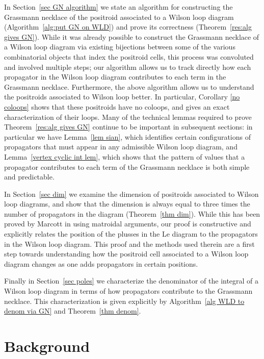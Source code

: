 \documentclass[11pt]{article}
\theoremstyle{remark}
\theoremstyle{definition}
\begin{document}
In Section~\ref{sec GN algorithm} we state an algorithm for constructing the Grassmann necklace of the positroid associated to a Wilson loop diagram (Algorithm~\ref{alg:put GN on WLD}) and prove its correctness (Theorem~\ref{res:alg gives GN}). While it was already possible to construct the Grassmann necklace of a Wilson loop diagram via existing bijections between some of the various combinatorial objects that index the positroid cells, this process was convoluted and involved multiple steps; our algorithm allows us to track directly how each propagator in the Wilson loop diagram contributes to each term in the Grassmann necklace. Furthermore, the above algorithm allows us to understand the positroids associated to Wilson loop better. In particular, Corollary \ref{no coloops} shows that these positroids have no coloops, and gives an exact characterization of their loops. Many of the technical lemmas required to prove Theorem~\ref{res:alg gives GN} continue to be important in subsequent sections: in particular we have Lemma~\ref{lem sian}, which identifies certain configurations of propagators that must appear in any admissible Wilson loop diagram, and Lemma~\ref{vertex cyclic int lem}, which shows that the pattern of values that a propagator contributes to each term of the Grassmann necklace is both simple and predictable.

In Section~\ref{sec dim} we examine the dimension of positroids associated to Wilson loop diagrams, and show that the dimension is always equal to three times the number of propagators in the diagram (Theorem~\ref{thm dim}).  While this has been proved by Marcott in \cite{WLDdim} using matroidal arguments, our proof is constructive and explicitly relates the position of the plusses in the Le diagram to the propagators in the Wilson loop diagram. This proof and the methods used therein are a first step towards understanding how the positroid cell associated to a Wilson loop diagram changes as one adds propagators in certain positions.

Finally in Section~\ref{sec poles} we characterize the denominator of the integral of a Wilson loop diagram in terms of how propagators contribute to the Grassmann necklace.  This characterization is given explicitly by Algorithm~\ref{alg WLD to denom via GN} and Theorem~\ref{thm denom}.


\section{Background}\label{section general background}
\end{document}
